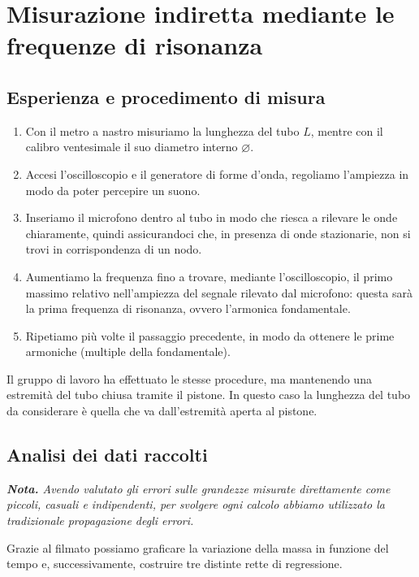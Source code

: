 \documentclass{article}
\newcommand*{\diam}{\varnothing}
\begin{document}
\pagebreak
\section{Misurazione indiretta mediante le frequenze di risonanza}

\subsection{Esperienza e procedimento di misura}

\begin{enumerate}
  \item
    Con il metro a nastro misuriamo la lunghezza del tubo $L$,
    mentre con il calibro ventesimale il suo diametro interno
    $\diam$.
  \item
    Accesi l'oscilloscopio e il generatore di forme d'onda,
    regoliamo l'ampiezza in modo da poter percepire un suono.
  \item
    Inseriamo il microfono dentro al tubo in modo che riesca a rilevare le onde
    chiaramente, quindi assicurandoci che, in presenza di onde stazionarie,
    non si trovi in corrispondenza di un nodo.
  \item
    Aumentiamo la frequenza fino a trovare, mediante l'oscilloscopio,
    il primo massimo relativo nell'ampiezza del segnale rilevato dal
    microfono: questa sarà la prima frequenza di risonanza,
    ovvero l'armonica fondamentale.
  \item
    Ripetiamo più volte il passaggio precedente, in modo da ottenere le prime
    armoniche (multiple della fondamentale).
\end{enumerate}
Il gruppo di lavoro ha effettuato le stesse procedure, ma mantenendo una
estremità del tubo chiusa tramite il pistone. In questo caso la lunghezza
del tubo da considerare è quella che va dall'estremità aperta al pistone.

\subsection{Analisi dei dati raccolti}
\emph{\textbf{Nota.}
Avendo valutato gli errori sulle grandezze misurate direttamente
come piccoli, casuali e indipendenti, per svolgere ogni calcolo
abbiamo utilizzato la tradizionale propagazione degli errori.
}

  Grazie al filmato possiamo graficare la variazione della massa in funzione del tempo
  e, successivamente, costruire tre distinte rette di regressione.
\end{document}
